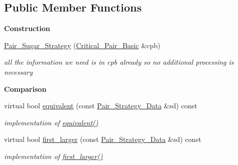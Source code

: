 \subsection*{Public Member Functions}
\begin{Indent}{\bf Construction}\par
\begin{DoxyCompactItemize}
\item 
\hyperlink{class_pair___sugar___strategy_afce73d01c9460ab1fde5d9eebe2aa7bc}{Pair\+\_\+\+Sugar\+\_\+\+Strategy} (\hyperlink{class_critical___pair___basic}{Critical\+\_\+\+Pair\+\_\+\+Basic} \&cpb)\hypertarget{class_pair___sugar___strategy_afce73d01c9460ab1fde5d9eebe2aa7bc}{}\label{class_pair___sugar___strategy_afce73d01c9460ab1fde5d9eebe2aa7bc}

\begin{DoxyCompactList}\small\item\em all the information we need is in {\ttfamily cpb} already so no additional processing is necessary \end{DoxyCompactList}\end{DoxyCompactItemize}
\end{Indent}
\begin{Indent}{\bf Comparison}\par
\begin{DoxyCompactItemize}
\item 
virtual bool \hyperlink{class_pair___sugar___strategy_a9beaf80a0af84c078e03048d256e964a}{equivalent} (const \hyperlink{class_pair___strategy___data}{Pair\+\_\+\+Strategy\+\_\+\+Data} \&sd) const \hypertarget{class_pair___sugar___strategy_a9beaf80a0af84c078e03048d256e964a}{}\label{class_pair___sugar___strategy_a9beaf80a0af84c078e03048d256e964a}

\begin{DoxyCompactList}\small\item\em implementation of \hyperlink{class_pair___sugar___strategy_a9beaf80a0af84c078e03048d256e964a}{equivalent()} \end{DoxyCompactList}\item 
virtual bool \hyperlink{class_pair___sugar___strategy_abc6bbb0cbe03c6ee0b1e5347d2103d7c}{first\+\_\+larger} (const \hyperlink{class_pair___strategy___data}{Pair\+\_\+\+Strategy\+\_\+\+Data} \&sd) const \hypertarget{class_pair___sugar___strategy_abc6bbb0cbe03c6ee0b1e5347d2103d7c}{}\label{class_pair___sugar___strategy_abc6bbb0cbe03c6ee0b1e5347d2103d7c}

\begin{DoxyCompactList}\small\item\em implementation of \hyperlink{class_pair___sugar___strategy_abc6bbb0cbe03c6ee0b1e5347d2103d7c}{first\+\_\+larger()} \end{DoxyCompactList}\end{DoxyCompactItemize}
\end{Indent}

